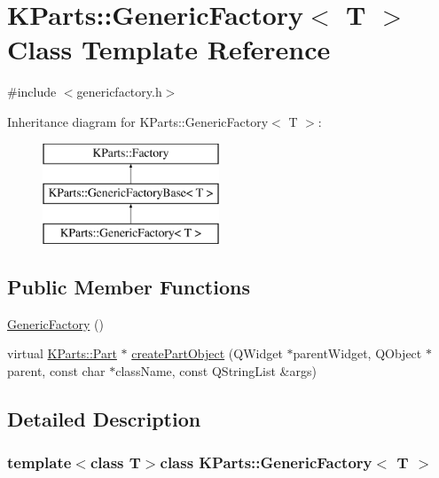 \hypertarget{classKParts_1_1GenericFactory}{\section{\-K\-Parts\-:\-:\-Generic\-Factory$<$ \-T $>$ \-Class \-Template \-Reference}
\label{classKParts_1_1GenericFactory}
}


{\ttfamily \#include $<$genericfactory.\-h$>$}

\-Inheritance diagram for \-K\-Parts\-:\-:\-Generic\-Factory$<$ \-T $>$\-:\begin{figure}[H]
\begin{center}
\leavevmode
\includegraphics[height=3.000000cm]{classKParts_1_1GenericFactory}
\end{center}
\end{figure}
\subsection*{\-Public \-Member \-Functions}
\begin{DoxyCompactItemize}
\item 
\hyperlink{classKParts_1_1GenericFactory_aef00baf603a775a324f84fb30ba5a0f4}{\-Generic\-Factory} ()
\item 
virtual \hyperlink{classKParts_1_1Part}{\-K\-Parts\-::\-Part} $\ast$ \hyperlink{classKParts_1_1GenericFactory_ac80d722fb2433018dfea04f0f6b89f74}{create\-Part\-Object} (\-Q\-Widget $\ast$parent\-Widget, \-Q\-Object $\ast$parent, const char $\ast$class\-Name, const \-Q\-String\-List \&args)
\end{DoxyCompactItemize}


\subsection{\-Detailed \-Description}
\subsubsection*{template$<$class T$>$class K\-Parts\-::\-Generic\-Factory$<$ T $>$}

